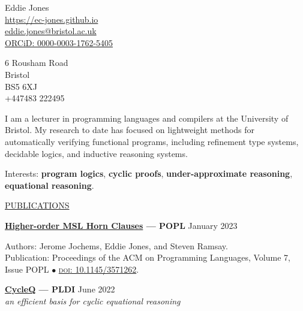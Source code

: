 \documentclass[10pt]{letter}
\renewcommand{\emph}[1]{\textit{#1}}
\begin{document}
\begin{minipage}[t]{0.7\textwidth}
  \raggedright{}
  {\huge Eddie Jones}
  \\[10pt]

  \href{https://ec-jones.github.io}{https://ec-jones.github.io}\\
  \href{mailto:eddie.jones@bristol.ac.uk}{eddie.jones@bristol.ac.uk} \\
  \href{https://orcid.org/0000-0003-1762-5405}{ORCiD: 0000-0003-1762-5405}
\end{minipage}
\begin{minipage}[t]{0.29\textwidth}
  \vfill

  \raggedleft{}
  6 Rousham Road\\
  Bristol\\
  BS5 6XJ\\
  +447483 222495
\end{minipage}

\vspace{5pt}

I am a lecturer in programming languages and compilers at the University of Bristol.
My research to date has focused on lightweight methods for automatically verifying functional programs, including refinement type systems, decidable logics, and inductive reasoning systems.

Interests: \textbf{program logics}, \textbf{cyclic proofs}, \textbf{under-approximate reasoning}, \textbf{equational reasoning}.

\vspace{10pt}

\uline{{\large PUBLICATIONS}\hfill}

\vspace{5pt}

\textbf{\href{https://dl.acm.org/doi/abs/10.1145/3571262}{Higher-order MSL Horn Clauses} --- POPL} \hfill January 2023

Authors: Jerome Jochems, Eddie Jones, and Steven Ramsay.\\
Publication: Proceedings of the ACM on Programming Languages, Volume 7, Issue POPL \( \bullet \) \href{https://doi.org/10.1145/3571262}{\textsc{doi}: 10.1145/3571262}.

\vspace{10pt}

\textbf{\href{https://dl.acm.org/doi/10.1145/3519939.3523731}{CycleQ} --- PLDI} \hfill June 2022\\
\emph{an efficient basis for cyclic equational reasoning}
\end{document}
